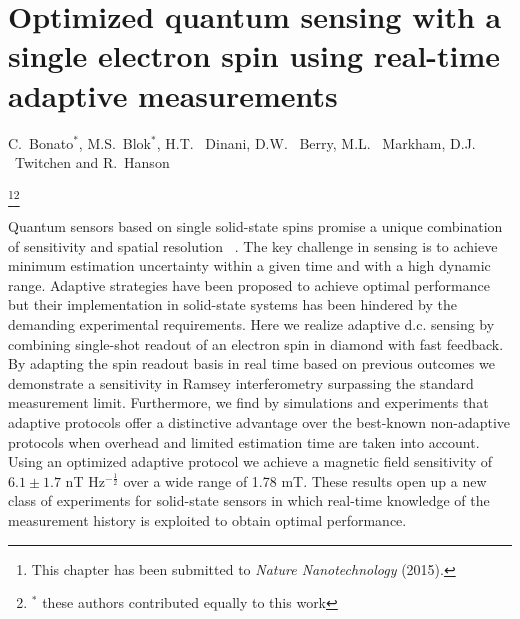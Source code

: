 

\graphicspath{{./ch_adptv_msmnt_magnetometry/figures/}}


\chapter[Optimized quantum sensing using real-time adaptive measurements]{ Optimized quantum sensing with a single electron spin using real-time adaptive measurements}
\label{ch:AMM}

\begin{center} 
    \vspace{-1cm} {C.~Bonato$^*$, M.S.~Blok$^*$, H.T. ~Dinani, D.W. ~Berry, M.L. ~Markham, D.J. ~Twitchen  and R.~Hanson} 
\end{center}

{\renewcommand{\thefootnote}{}\footnote{This chapter has been submitted to
    {\em Nature Nanotechnology} (2015).}\footnote{$^*$ these authors contributed equally to this work}}

\vspace{-0.5cm} 
Quantum sensors based on single solid-state spins promise a unique combination of sensitivity and spatial resolution ~\cite{Giovannetti_NatPhoton_2011,Higgins_Nature_2007,Degen_APL_2008,Taylor_NatPhys_2008,Maze_Nature_2008,Balasubramanian_Nature_2008,Balasubramanian_NatMater_2009,Dolde_NatPhys_2011,Acosta_Phys.Rev.Lett._2010,Toyli_PNAS_2013,Ovartchaiyapong_NatCommun_2014,LeSage_Nature_2013,Kaufmann_PNAS_2013,Kucsko_Nature_2013,Shi_Science_2015,Maletinsky_NatNano_2012,Staudacher_Science_2013,Mamin_Science_2013,Tetienne_Science_2014,Kolkowitz_Science_2015}. The key challenge in sensing is to achieve minimum estimation uncertainty within a given time and with a high dynamic range. Adaptive strategies have been proposed to achieve optimal performance but their implementation in solid-state systems has been hindered by the demanding experimental requirements. Here we realize adaptive d.c. sensing by combining single-shot readout of an electron spin in diamond with fast feedback. By adapting the spin readout basis in real time based on previous outcomes we demonstrate a sensitivity in Ramsey interferometry surpassing the standard measurement limit. Furthermore, we find by simulations and experiments that adaptive protocols offer a distinctive advantage over the best-known non-adaptive protocols when overhead and limited estimation time are taken into account. Using an optimized adaptive protocol we achieve a magnetic field sensitivity of $6.1\pm 1.7$ nT Hz$^{-\frac{1}{2}}$ over a wide range of 1.78 mT. These results open up a new class of experiments for solid-state sensors in which real-time knowledge of the measurement history is exploited to obtain optimal performance.


